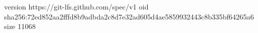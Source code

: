 version https://git-lfs.github.com/spec/v1
oid sha256:72ed852aa2fffd8b9adbda2c8d7e32ad605d4ae5859932443c8b335bf64265a6
size 11068
